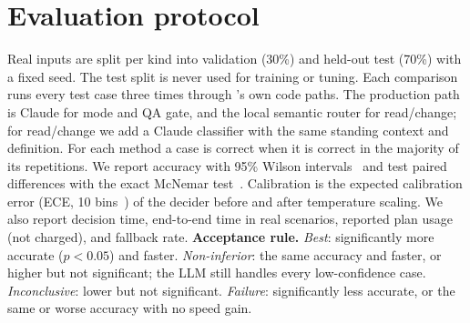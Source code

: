 \section{Evaluation protocol}\label{sec:protocol}
Real inputs are split per kind into validation (30\%) and held-out test (70\%) with a fixed seed. The test split is never used for training or tuning. Each comparison runs every test case three times through \sys{}'s own code paths. The production path is Claude for mode and QA gate, and the local semantic router for read/change; for read/change we add a Claude classifier with the same standing context and definition.
For each method a case is correct when it is correct in the majority of its repetitions. We report accuracy with 95\% Wilson intervals~\cite{wilson1927} and test paired differences with the exact McNemar test~\cite{mcnemar1947}. Calibration is the expected calibration error (ECE, 10 bins~\cite{naeini2015}) of the decider before and after temperature scaling. We also report decision time, end-to-end time in real scenarios, reported plan usage (not charged), and fallback rate.
\textbf{Acceptance rule.} \emph{Best}: significantly more accurate ($p<0.05$) and faster. \emph{Non-inferior}: the same accuracy and faster, or higher but not significant; the LLM still handles every low-confidence case. \emph{Inconclusive}: lower but not significant. \emph{Failure}: significantly less accurate, or the same or worse accuracy with no speed gain.
